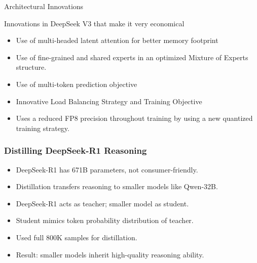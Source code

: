 \begin{frame}[fragile]{ Architectural Innovations}

Innovations in DeepSeek V3 that make it very economical

    \begin{itemize}
        \item   Use of multi-headed latent attention for better memory footprint
        \item   Use of fine-grained and shared experts in an optimized Mixture of Experts 
structure.
        \item   Use of multi-token prediction objective
        \item   Innovative Load Balancing Strategy and Training Objective
        \item   Uses a reduced FP8 precision throughout training by using a new quantized training 
strategy.
    \end{itemize}
\end{frame}


\begin{frame}[fragile]\frametitle{Distilling DeepSeek-R1 Reasoning}

      \begin{itemize}
        \item DeepSeek-R1 has 671B parameters, not consumer-friendly.
        \item Distillation transfers reasoning to smaller models like Qwen-32B.
        \item DeepSeek-R1 acts as teacher; smaller model as student.
        \item Student mimics token probability distribution of teacher.
        \item Used full 800K samples for distillation.
        \item Result: smaller models inherit high-quality reasoning ability.
      \end{itemize}

\end{frame}

